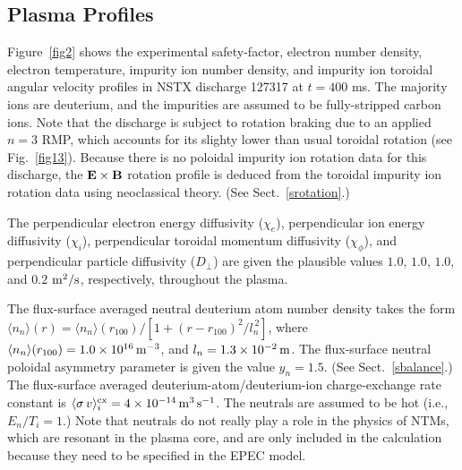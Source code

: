 \documentclass[12pt,prb,aps]{revtex4-1}
\begin{document}
\subsection{Plasma Profiles}
Figure~\ref{fig2} shows the experimental safety-factor, electron number density, electron temperature, impurity ion number density, and impurity ion toroidal angular velocity profiles in NSTX discharge 127317 at $t=400$ ms. The majority ions are deuterium, and the impurities are assumed to
be fully-stripped carbon ions. Note that the discharge is subject to rotation braking due to an applied $n=3$ RMP, which accounts for its slighty lower than usual toroidal rotation (see Fig.~\ref{fig13}). Because there is no
poloidal impurity ion rotation data for this discharge, the ${\bf E}\times {\bf B}$ rotation profile is deduced from the
toroidal  impurity ion rotation data using neoclassical theory. (See Sect.~\ref{srotation}.) 

The perpendicular electron energy diffusivity ($\chi_e$), perpendicular ion energy diffusivity ($\chi_i$), perpendicular toroidal momentum diffusivity ($\chi_\phi$), and perpendicular particle diffusivity ($D_\perp$) are given the plausible values $1.0$, $1.0$, $1.0$, and $0.2$
${\rm m}^2/{\rm s}$, respectively,  throughout the plasma.

 The flux-surface averaged neutral deuterium atom number density takes the form $\langle n_n\rangle(r) = \langle n_n\rangle(r_{100})/[1+(r-r_{100})^2/l_n^{\,2}]$, where
$\langle n_n\rangle(r_{100})= 1.0\times 10^{16}\,{\rm m}^{-3}$, and $l_n=1.3\times 10^{-2}\,{\rm m}$. The flux-surface neutral poloidal asymmetry parameter is given the value $y_n=1.5$. (See Sect.~\ref{sbalance}.) The flux-surface averaged deuterium-atom/deuterium-ion charge-exchange rate constant is $\langle \sigma\,v\rangle_i^{{\rm cx}} = 4\times 10^{-14}\,{\rm m}^{3}\,{\rm s}^{-1}$.\cite{barnett} The neutrals are assumed to be hot (i.e., $E_n/T_i=1$.) 
Note that neutrals do not really play a role in the physics of NTMs, which are resonant in the plasma core, and are
only included in the calculation because they need to be specified in the EPEC model. 
\end{document}
